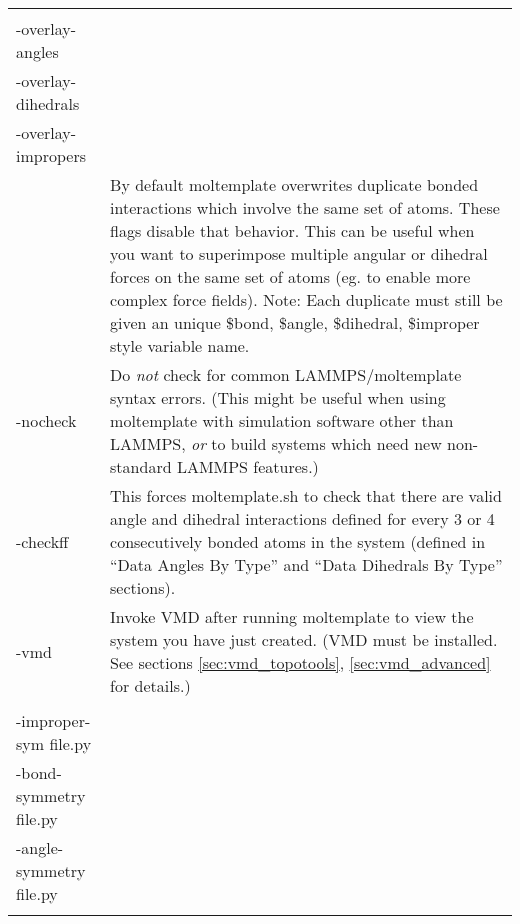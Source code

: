 \documentclass[11pt]{article}
\begin{document}
\begin{longtable}[h]{l|p{10cm}}
\begin{tabular}[t]{l}
-overlay-bonds
\\
-overlay-angles
\\
-overlay-dihedrals
\\
-overlay-impropers
\\
\end{tabular}
& 
By default moltemplate overwrites 
duplicate bonded interactions which
involve the same set of atoms.
These flags disable that behavior.
This can be useful when you want to superimpose 
multiple angular or dihedral forces on the same set of atoms
(eg. to enable more complex force fields).
Note: Each duplicate must still be given an unique
\$bond, \$angle, \$dihedral, \$improper style variable name.
\\
\hline
-nocheck &
Do \textit{not} check for common LAMMPS/moltemplate syntax errors.
(This might be useful when using moltemplate 
 with simulation software other than LAMMPS,
 \textit{or} to build systems which need new non-standard LAMMPS features.)
\\
\hline
-checkff &
This forces moltemplate.sh to check that there
are valid angle and dihedral interactions defined for every
3 or 4 consecutively bonded atoms in the system
(defined in ``Data Angles By Type'' and ``Data Dihedrals By Type'' sections).
\\
\hline
-vmd &
Invoke VMD after running moltemplate to view the system you have just created.
(VMD must be installed.  
 See sections \ref{sec:vmd_topotools}, \ref{sec:vmd_advanced} for details.)
\\
\hline
\begin{tabular}[t]{l}
-dihedral-sym file.py
\\
-improper-sym file.py
\\
-bond-symmetry file.py
\\
-angle-symmetry file.py
\\
\end{tabular}

\end{longtable}
\end{document}
